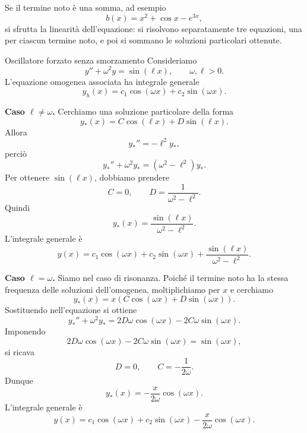 \documentclass[a4paper]{article}
\begin{document}
\begin{radioactive}
Se il termine noto è una somma, ad esempio
\[
    b(x)=x^2+\cos x-e^{3x},
\]
si sfrutta la linearità dell'equazione: si risolvono separatamente tre equazioni, una per ciascun termine noto, e poi si sommano le soluzioni particolari ottenute.
\end{radioactive}

\begin{radioactive}
\begin{snippetexample}{Oscillatore forzato senza smorzamento}
    Consideriamo
    \[
        y''+\omega^2y=\sin(\ell x),
        \qquad
        \omega,\ell>0.
    \]
    L'equazione omogenea associata ha integrale generale
    \[
        y_h(x)=c_1\cos(\omega x)+c_2\sin(\omega x).
    \]

    \textbf{Caso \(\ell\neq\omega\).}
    Cerchiamo una soluzione particolare della forma
    \[
        y_\ast(x)=C\cos(\ell x)+D\sin(\ell x).
    \]
    Allora
    \[
        y_\ast''=-\ell^2y_\ast,
    \]
    perciò
    \[
        y_\ast''+\omega^2y_\ast=(\omega^2-\ell^2)y_\ast.
    \]
    Per ottenere \(\sin(\ell x)\), dobbiamo prendere
    \[
        C=0,
        \qquad
        D=\frac{1}{\omega^2-\ell^2}.
    \]
    Quindi
    \[
        y_\ast(x)=\frac{\sin(\ell x)}{\omega^2-\ell^2}.
    \]
    L'integrale generale è
    \[
        y(x)=c_1\cos(\omega x)+c_2\sin(\omega x)+\frac{\sin(\ell x)}{\omega^2-\ell^2}.
    \]

    \textbf{Caso \(\ell=\omega\).}
    Siamo nel caso di risonanza. Poiché il termine noto ha la stessa frequenza delle soluzioni dell'omogenea, moltiplichiamo per \(x\) e cerchiamo
    \[
        y_\ast(x)=x\left(C\cos(\omega x)+D\sin(\omega x)\right).
    \]
    Sostituendo nell'equazione si ottiene
    \[
        y_\ast''+\omega^2y_\ast
        =
        2D\omega\cos(\omega x)-2C\omega\sin(\omega x).
    \]
    Imponendo
    \[
        2D\omega\cos(\omega x)-2C\omega\sin(\omega x)=\sin(\omega x),
    \]
    si ricava
    \[
        D=0,
        \qquad
        C=-\frac{1}{2\omega}.
    \]
    Dunque
    \[
        y_\ast(x)=-\frac{x}{2\omega}\cos(\omega x).
    \]
    L'integrale generale è
    \[
        y(x)=c_1\cos(\omega x)+c_2\sin(\omega x)-\frac{x}{2\omega}\cos(\omega x).
    \]

    \begin{center}
    \end{center}
\end{snippetexample}
\end{radioactive}
\end{document}
